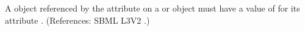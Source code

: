 A \Parameter object referenced by the attribute  on
a \Species or \Model object must have a value of  for its
attribute .  (References: SBML L3V2
.)
